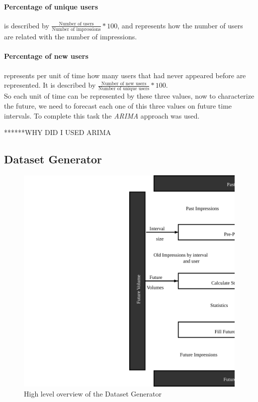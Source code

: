 \paragraph{Percentage of unique users}
is described by $\frac{\text{Number of users}}{\text{Number of impressions}}
* 100$, and represents how the number of users are related with the number of
impressions.

\paragraph{Percentage of new users}
represents per unit of time how many users that had never appeared before are
represented. It is described by $\frac{\text{Number of new users}}{\text{Number
of unique users}}*100$.
\\

So each unit of time can be represented by these three values, now to
characterize the future, we need to forecast each one of this three values
on future time intervals. To complete this task the \emph{ARIMA} approach was used.


******WHY DID I USED ARIMA

\subsection{Dataset Generator}

\begin{figure}[h] \begin{center} \leavevmode
\includegraphics[]{high_level_file_gen} \caption{ High level overview
of the Dataset Generator } \label{fig:highlevel_arch_file_gen} \end{center} \end{figure}

